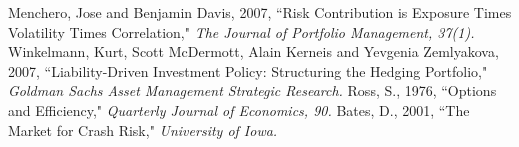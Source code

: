 \documentclass[oneside,12pt]{report}
\begin{document}
\newpage
\begin{thebibliography}{4}  
\bibitem{} Menchero, Jose and Benjamin Davis, 2007, ``Risk Contribution is Exposure Times Volatility Times Correlation," \emph{The Journal of Portfolio Management, 37(1).} 
\bibitem{}  Winkelmann, Kurt, Scott McDermott, Alain Kerneis and Yevgenia Zemlyakova, 2007, ``Liability-Driven Investment Policy: Structuring the Hedging Portfolio," \emph{Goldman Sachs Asset Management Strategic Research.}
\bibitem{}  Ross, S., 1976, ``Options and Efficiency," \emph{Quarterly Journal of Economics, 90.}
\bibitem{}  Bates, D., 2001, ``The Market for Crash Risk," \emph{University of Iowa.}
\end{thebibliography}



\renewcommand\bibname{Selected Bibliography Including Cited Works}
\nocite{*}  %

\end{document}
